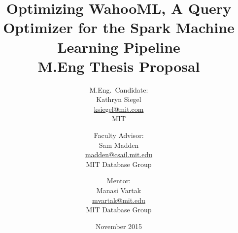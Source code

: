 \documentclass[\myfontsize, letterpaper]{article}
\title{\vspace{-15mm}\fontsize{20pt}{10pt}\selectfont\textbf{Optimizing WahooML, A Query Optimizer for the Spark Machine Learning Pipeline}\\[1\baselineskip] \Large{M.Eng Thesis Proposal}} %
\author{
M.Eng.\ Candidate:\\
Kathryn Siegel\\
\href{mailto:ksiegel@mit.edu}{ksiegel@mit.com}\\
MIT
\and
Faculty Advisor:\\
Sam Madden\\
\href{mailto:madden@csail.mit.edu}{madden@csail.mit.edu}\\
MIT Database Group
\and
Mentor:\\
Manasi Vartak\\
\href{mailto:mvartak@mit.edu}{mvartak@mit.edu}\\
MIT Database Group
}
\date{November 2015}
\begin{document}
\maketitle %




\vspace{4mm}

\begin{multicols}{2}
















\end{multicols}
\end{document}
